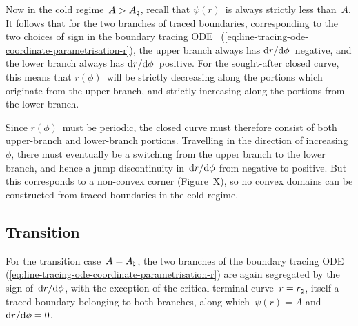 Now in the cold regime~$A > A_\natural$,
recall that $\psi (r)$~is always strictly less than~$A$.
It follows that for the two branches of traced boundaries,
corresponding to the two choices of sign in the boundary tracing ODE~%
  (\ref{eq:line-tracing-ode-coordinate-parametrisation-r}),
the upper branch always has $\mathop{}\!\mathrm{d} r / {\mathop{}\!\mathrm{d}\phi}$~negative,
and the lower branch always has $\mathop{}\!\mathrm{d} r / {\mathop{}\!\mathrm{d}\phi}$~positive.
For the sought-after closed curve,
this means that $r (\phi)$~will be strictly decreasing
along the portions which originate from the upper branch,
and strictly increasing along the portions from the lower branch.

Since $r (\phi)$~must be periodic,
the closed curve must therefore consist of both
upper-branch and lower-branch portions.
Travelling in the direction of increasing~$\phi$,
there must eventually be a switching
from the upper branch to the lower branch,
and hence a jump discontinuity in~$\mathop{}\!\mathrm{d} r / {\mathop{}\!\mathrm{d}\phi}$
from negative to positive.
But this corresponds to a non-convex corner
(Figure~X), %
so no convex domains can be constructed from traced boundaries
in the cold regime.

\subsection{Transition}
\label{sec:polar.tracing.transition}

For the transition case~$A = A_\natural$,
the two branches of the boundary tracing ODE~%
  (\ref{eq:line-tracing-ode-coordinate-parametrisation-r})
are again segregated by the sign of~$\mathop{}\!\mathrm{d} r / {\mathop{}\!\mathrm{d}\phi}$,
with the exception of the critical terminal curve~$r = r_\natural$,
itself a traced boundary belonging to both branches,
along which~$\psi (r) = A$ and~$\mathop{}\!\mathrm{d} r / {\mathop{}\!\mathrm{d}\phi} = 0$.

